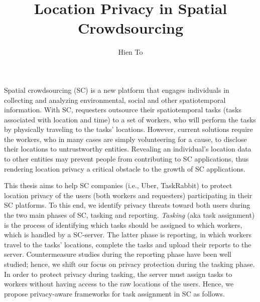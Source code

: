 \documentclass{USC-Thesis}
\title{Location Privacy in Spatial Crowdsourcing}
\author{Hien To}
\numberwithin{equation}{chapter}
\begin{document}
\maketitle



\tableofcontents
\listoftables
\listoffigures

\mainmatter
\newtheorem{lemma}{Lemma}


Spatial crowdsourcing (SC) is a new platform that engages individuals in collecting and analyzing environmental, social and other spatiotemporal information. With SC, requesters outsource their spatiotemporal tasks (tasks associated with location and time) to a set of workers, who will perform the tasks by physically traveling to the tasks' locations. However, current solutions require the workers, who in many cases are simply volunteering for a cause, to disclose their locations to untrustworthy entities. Revealing an individual's location data to other entities may prevent people from contributing to SC applications, thus rendering location privacy a critical obstacle to the growth of SC applications.

This thesis aims to help SC companies (i.e., Uber, TaskRabbit) to protect location privacy of the users (both workers and requesters) participating in their SC platforms. To this end, we identify privacy threats toward both users during the two main phases of SC, tasking and reporting. \emph{Tasking} (aka task assignment) is the process of identifying which tasks should be assigned to which workers, which is handled by a SC-server. The latter phase is reporting, in which workers travel to the tasks' locations, complete the tasks and upload their reports to the server. Countermeasure studies during the reporting phase have been well studied; hence, we shift our focus on privacy protection during the tasking phase. In order to protect privacy during tasking, the server must assign tasks to workers without having access to the raw locations of the users. Hence, we propose privacy-aware frameworks for task assignment in SC as follows.
\end{document}
